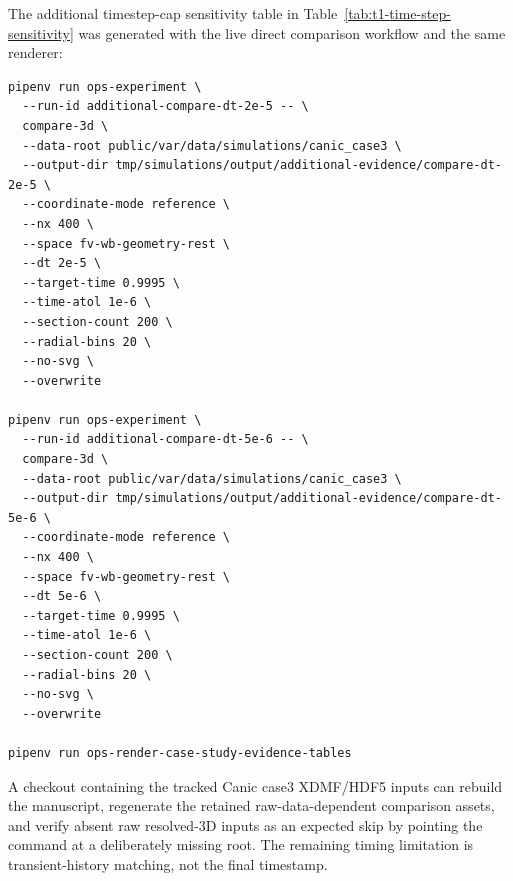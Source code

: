The additional timestep-cap sensitivity table in
Table~\ref{tab:t1-time-step-sensitivity} was generated with the live direct
comparison workflow and the same renderer:
\begin{lstlisting}[basicstyle=\ttfamily\footnotesize,breaklines=true]
pipenv run ops-experiment \
  --run-id additional-compare-dt-2e-5 -- \
  compare-3d \
  --data-root public/var/data/simulations/canic_case3 \
  --output-dir tmp/simulations/output/additional-evidence/compare-dt-2e-5 \
  --coordinate-mode reference \
  --nx 400 \
  --space fv-wb-geometry-rest \
  --dt 2e-5 \
  --target-time 0.9995 \
  --time-atol 1e-6 \
  --section-count 200 \
  --radial-bins 20 \
  --no-svg \
  --overwrite

pipenv run ops-experiment \
  --run-id additional-compare-dt-5e-6 -- \
  compare-3d \
  --data-root public/var/data/simulations/canic_case3 \
  --output-dir tmp/simulations/output/additional-evidence/compare-dt-5e-6 \
  --coordinate-mode reference \
  --nx 400 \
  --space fv-wb-geometry-rest \
  --dt 5e-6 \
  --target-time 0.9995 \
  --time-atol 1e-6 \
  --section-count 200 \
  --radial-bins 20 \
  --no-svg \
  --overwrite

pipenv run ops-render-case-study-evidence-tables
\end{lstlisting}
A checkout containing the tracked Canic case3 XDMF/HDF5 inputs can rebuild the
manuscript, regenerate the retained raw-data-dependent comparison assets, and
verify absent raw resolved-3D inputs as an expected skip by pointing the command
at a deliberately missing root. The remaining timing limitation is
transient-history matching, not the final timestamp.

